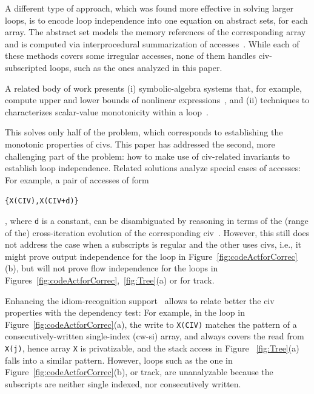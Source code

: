 \documentclass{sig-alternate}
\begin{document}
A different type of approach, which was found more effective in
solving larger loops, is to encode loop independence into one equation 
on abstract sets, for each array. The abstract set models the
memory references of the corresponding array and is computed 
via interprocedural summarization of 
accesses~\cite{SUIF,Moon99PredArrDataFlow,SummaryMonot,LMAD}.
While each of these methods covers some irregular accesses,
none of them handles {\sc civ}-subscripted loops,   
such as the ones analyzed in this paper.
%

A related  body of work presents (i) symbolic-algebra systems that, for example,  
compute upper and lower bounds of nonlinear expressions~\cite{Fahringer97EffSymb},
and (ii) techniques to characterizes scalar-value monotonicity within a 
loop~\cite{VEG,MonStmt}.

This solves only half of the problem, which   
corresponds to establishing the monotonic properties of {\sc civ}s.
This paper has addressed the second, more challenging part of the problem: 
how to make use of {\sc civ}-related invariants to establish 
loop independence. 
Related solutions analyze special cases of accesses:
%
For example, a pair of accesses of form  
\begin{small}{\tt\{X(CIV),X(CIV+d)\}}\end{small}, where {\tt d} is a constant,
can be disambiguated by reasoning in terms of the
(range of the) cross-iteration evolution of the corresponding {\sc civ}~\cite{CohenBeyondMon}.
%
However, this still does not address the case when a subscripts is regular
and the other uses {\sc civ}s, i.e., it might prove output 
independence for the loop in Figure~\ref{fig:codeActforCorrec}(b),
but will not prove flow independence for the loops in 
Figures~\ref{fig:codeActforCorrec},~\ref{fig:Tree}(a)
or for {\sc track}. %

Enhancing the idiom-recognition support~\cite{PaduaStackArr,PaduaDemDrInterproc} 
allows to relate better the {\sc civ} properties with the dependency test: 
For example, in the loop in Figure~\ref{fig:codeActforCorrec}(a), the write to 
{\tt X(CIV)} matches the pattern of a consecutively-written single-index ({\sc cw-si}) 
array, and always covers the read from {\tt X(j)}, hence array {\tt X} is privatizable,
and the stack access in Figure ~\ref{fig:Tree}(a) falls into a similar pattern.
%
%
However, loops such as the one in Figure~\ref{fig:codeActforCorrec}(b),
or {\sc track}, are unanalyzable because 
the subscripts are neither single indexed, nor consecutively written.  
\end{document}
